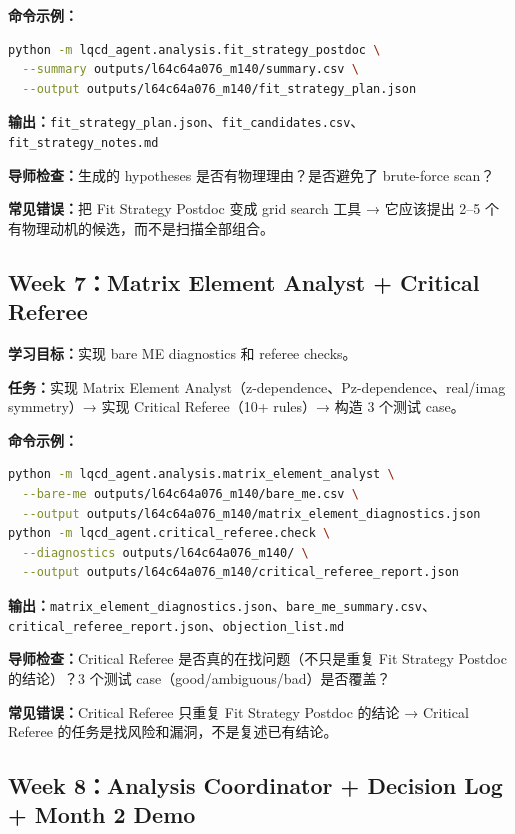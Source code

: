 \documentclass[11pt,a4paper,fontset=fandol]{ctexart}
\begin{document}
\textbf{命令示例：}
\begin{lstlisting}[language=bash]
python -m lqcd_agent.analysis.fit_strategy_postdoc \
  --summary outputs/l64c64a076_m140/summary.csv \
  --output outputs/l64c64a076_m140/fit_strategy_plan.json
\end{lstlisting}

\textbf{输出：}\texttt{fit\_strategy\_plan.json}、\texttt{fit\_candidates.csv}、\texttt{fit\_strategy\_notes.md}

\textbf{导师检查：}生成的 hypotheses 是否有物理理由？是否避免了 brute-force scan？

\textbf{常见错误：}把 Fit Strategy Postdoc 变成 grid search 工具 → 它应该提出 2--5 个有物理动机的候选，而不是扫描全部组合。

\subsection{Week 7：Matrix Element Analyst + Critical Referee}

\textbf{学习目标：}实现 bare ME diagnostics 和 referee checks。

\textbf{任务：}实现 Matrix Element Analyst（z-dependence、Pz-dependence、real/imag symmetry）→ 实现 Critical Referee（10+ rules）→ 构造 3 个测试 case。

\textbf{命令示例：}
\begin{lstlisting}[language=bash]
python -m lqcd_agent.analysis.matrix_element_analyst \
  --bare-me outputs/l64c64a076_m140/bare_me.csv \
  --output outputs/l64c64a076_m140/matrix_element_diagnostics.json
python -m lqcd_agent.critical_referee.check \
  --diagnostics outputs/l64c64a076_m140/ \
  --output outputs/l64c64a076_m140/critical_referee_report.json
\end{lstlisting}

\textbf{输出：}\texttt{matrix\_element\_diagnostics.json}、\texttt{bare\_me\_summary.csv}、\texttt{critical\_referee\_report.json}、\texttt{objection\_list.md}

\textbf{导师检查：}Critical Referee 是否真的在找问题（不只是重复 Fit Strategy Postdoc 的结论）？3 个测试 case（good/ambiguous/bad）是否覆盖？

\textbf{常见错误：}Critical Referee 只重复 Fit Strategy Postdoc 的结论 → Critical Referee 的任务是找风险和漏洞，不是复述已有结论。

\subsection{Week 8：Analysis Coordinator + Decision Log + Month 2 Demo}
\end{document}
